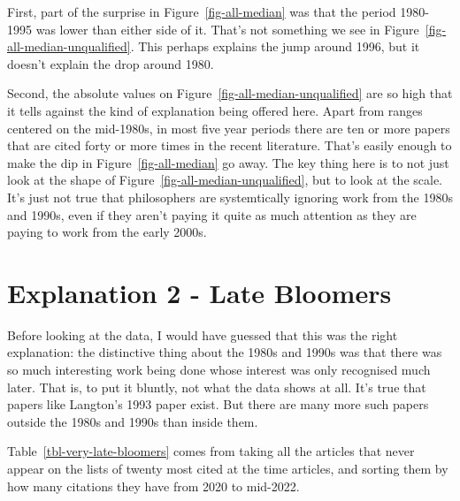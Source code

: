 \documentclass[
  10pt,
  letterpaper,
  DIV=11,
  numbers=noendperiod,
  twoside]{scrartcl}
\begin{document}
First, part of the surprise in Figure~\ref{fig-all-median} was that the
period 1980-1995 was lower than either side of it. That's not something
we see in Figure~\ref{fig-all-median-unqualified}. This perhaps explains
the jump around 1996, but it doesn't explain the drop around 1980.

Second, the absolute values on Figure~\ref{fig-all-median-unqualified}
are so high that it tells against the kind of explanation being offered
here. Apart from ranges centered on the mid-1980s, in most five year
periods there are ten or more papers that are cited forty or more times
in the recent literature. That's easily enough to make the dip in
Figure~\ref{fig-all-median} go away. The key thing here is to not just
look at the shape of Figure~\ref{fig-all-median-unqualified}, but to
look at the scale. It's just not true that philosophers are
systemtically ignoring work from the 1980s and 1990s, even if they
aren't paying it quite as much attention as they are paying to work from
the early 2000s.

\section{Explanation 2 - Late Bloomers}\label{sec-late-bloomers}

Before looking at the data, I would have guessed that this was the right
explanation: the distinctive thing about the 1980s and 1990s was that
there was so much interesting work being done whose interest was only
recognised much later. That is, to put it bluntly, not what the data
shows at all. It's true that papers like Langton's 1993 paper exist. But
there are many more such papers outside the 1980s and 1990s than inside
them.

Table~\ref{tbl-very-late-bloomers} comes from taking all the articles
that never appear on the lists of twenty most cited at the time
articles, and sorting them by how many citations they have from 2020 to
mid-2022.
\end{document}
